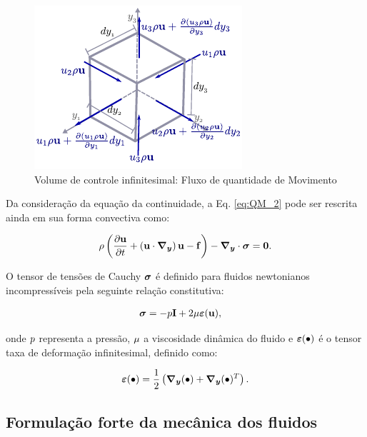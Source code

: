 \documentclass[tese_patricia]{subfiles}%
\begin{document}
\begin{figure}[htb!]
	\centering 
	\includegraphics[scale=1.5,trim=0cm 0.0cm 0cm 0.0cm, clip=true]{Imagens/Cap2/volInf_consQtdeMov.pdf}	
	\caption{Volume de controle infinitesimal: Fluxo de quantidade de Movimento}
	\label{fig:volInf_consQtdeMov}
\end{figure}

Da consideração da equação da continuidade, a Eq. \ref{eq:QM_2} pode ser rescrita ainda em sua forma convectiva como:

\begin{align}
	\rho\left(\frac{\partial\mathbf{u}}{\partial t} + \left( \mathbf{u} \cdot \boldsymbol{\nabla_y} \right)  \mathbf{u}  - \mathbf{f} \right) - \boldsymbol{\nabla_y} \cdot \boldsymbol{\sigma} = \mathbf{0}. \label{eq:Navier-Stokes} 
\end{align}

O tensor de tensões de Cauchy $\boldsymbol{\sigma}$ é definido para fluidos newtonianos incompressíveis pela seguinte relação constitutiva:

\begin{align}
\boldsymbol{\sigma} &= -p \mathbf{I} + 2\mu\bm{\varepsilon}(\mathbf{u}),\label{eq:tensor_tensoes_fluido}
\end{align}

\noindent onde $p$ representa a pressão, $\mu$ a viscosidade dinâmica do fluido e $\bm{\varepsilon}(\bullet)$ é o tensor taxa de deformação infinitesimal, definido como:


\begin{align}
\bm{\varepsilon}(\bullet) = \frac{1}{2}\left(\boldsymbol{\nabla_y} (\bullet) + \boldsymbol{\nabla_y} (\bullet)^{T}\right). 
\label{eq:tensor_taxa_defor}
\end{align}

\subsection{Formulação forte da mecânica dos fluidos}
\end{document}
